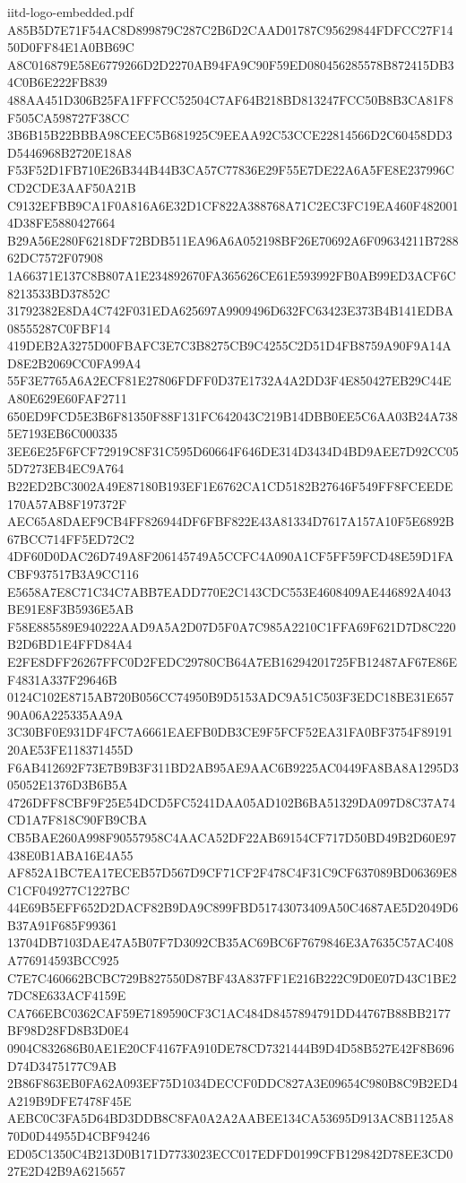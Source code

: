 \begin{filecontents*}[overwrite]{iitd-logo-embedded.pdf}
A85B5D7E71F54AC8D899879C287C2B6D2CAAD01787C95629844FDFCC27F1450D0FF84E1A0BB69C
A8C016879E58E6779266D2D2270AB94FA9C90F59ED080456285578B872415DB34C0B6E222FB839
488AA451D306B25FA1FFFCC52504C7AF64B218BD813247FCC50B8B3CA81F8F505CA598727F38CC
3B6B15B22BBBA98CEEC5B681925C9EEAA92C53CCE22814566D2C60458DD3D5446968B2720E18A8
F53F52D1FB710E26B344B44B3CA57C77836E29F55E7DE22A6A5FE8E237996CCD2CDE3AAF50A21B
C9132EFBB9CA1F0A816A6E32D1CF822A388768A71C2EC3FC19EA460F4820014D38FE5880427664
B29A56E280F6218DF72BDB511EA96A6A052198BF26E70692A6F09634211B728862DC7572F07908
1A66371E137C8B807A1E234892670FA365626CE61E593992FB0AB99ED3ACF6C8213533BD37852C
31792382E8DA4C742F031EDA625697A9909496D632FC63423E373B4B141EDBA08555287C0FBF14
419DEB2A3275D00FBAFC3E7C3B8275CB9C4255C2D51D4FB8759A90F9A14AD8E2B2069CC0FA99A4
55F3E7765A6A2ECF81E27806FDFF0D37E1732A4A2DD3F4E850427EB29C44EA80E629E60FAF2711
650ED9FCD5E3B6F81350F88F131FC642043C219B14DBB0EE5C6AA03B24A7385E7193EB6C000335
3EE6E25F6FCF72919C8F31C595D60664F646DE314D3434D4BD9AEE7D92CC055D7273EB4EC9A764
B22ED2BC3002A49E87180B193EF1E6762CA1CD5182B27646F549FF8FCEEDE170A57AB8F197372F
AEC65A8DAEF9CB4FF826944DF6FBF822E43A81334D7617A157A10F5E6892B67BCC714FF5ED72C2
4DF60D0DAC26D749A8F206145749A5CCFC4A090A1CF5FF59FCD48E59D1FACBF937517B3A9CC116
E5658A7E8C71C34C7ABB7EADD770E2C143CDC553E4608409AE446892A4043BE91E8F3B5936E5AB
F58E885589E940222AAD9A5A2D07D5F0A7C985A2210C1FFA69F621D7D8C220B2D6BD1E4FFD84A4
E2FE8DFF26267FFC0D2FEDC29780CB64A7EB16294201725FB12487AF67E86EF4831A337F29646B
0124C102E8715AB720B056CC74950B9D5153ADC9A51C503F3EDC18BE31E65790A06A225335AA9A
3C30BF0E931DF4FC7A6661EAEFB0DB3CE9F5FCF52EA31FA0BF3754F8919120AE53FE118371455D
F6AB412692F73E7B9B3F311BD2AB95AE9AAC6B9225AC0449FA8BA8A1295D305052E1376D3B6B5A
4726DFF8CBF9F25E54DCD5FC5241DAA05AD102B6BA51329DA097D8C37A74CD1A7F818C90FB9CBA
CB5BAE260A998F90557958C4AACA52DF22AB69154CF717D50BD49B2D60E97438E0B1ABA16E4A55
AF852A1BC7EA17ECEB57D567D9CF71CF2F478C4F31C9CF637089BD06369E8C1CF049277C1227BC
44E69B5EFF652D2DACF82B9DA9C899FBD51743073409A50C4687AE5D2049D6B37A91F685F99361
13704DB7103DAE47A5B07F7D3092CB35AC69BC6F7679846E3A7635C57AC408A776914593BCC925
C7E7C460662BCBC729B827550D87BF43A837FF1E216B222C9D0E07D43C1BE27DC8E633ACF4159E
CA766EBC0362CAF59E7189590CF3C1AC484D8457894791DD44767B88BB2177BF98D28FD8B3D0E4
0904C832686B0AE1E20CF4167FA910DE78CD7321444B9D4D58B527E42F8B696D74D3475177C9AB
2B86F863EB0FA62A093EF75D1034DECCF0DDC827A3E09654C980B8C9B2ED4A219B9DFE7478F45E
AEBC0C3FA5D64BD3DDB8C8FA0A2A2AABEE134CA53695D913AC8B1125A870D0D44955D4CBF94246
ED05C1350C4B213D0B171D7733023ECC017EDFD0199CFB129842D78EE3CD027E2D42B9A6215657

\end{filecontents*}

